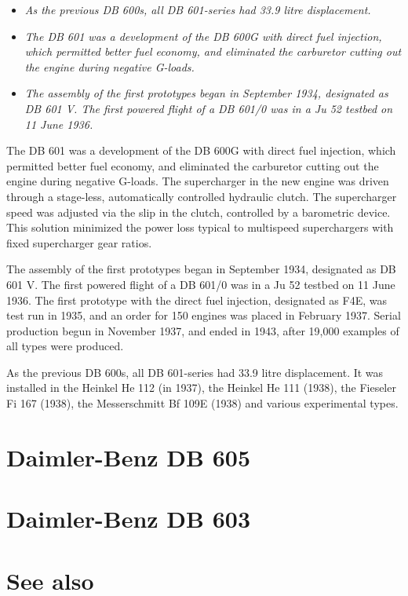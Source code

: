 \begin{itemize}
\item
  \emph{As the previous DB 600s, all DB 601-series had 33.9 litre
  displacement.}
\item
  \emph{The DB 601 was a development of the DB 600G with direct fuel
  injection, which permitted better fuel economy, and eliminated the
  carburetor cutting out the engine during negative G-loads.}
\item
  \emph{The assembly of the first prototypes began in September 1934,
  designated as DB 601 V. The first powered flight of a DB 601/0 was in
  a Ju 52 testbed on 11 June 1936.}
\end{itemize}

The DB 601 was a development of the DB 600G with direct fuel injection,
which permitted better fuel economy, and eliminated the carburetor
cutting out the engine during negative G-loads. The supercharger in the
new engine was driven through a stage-less, automatically controlled
hydraulic clutch. The supercharger speed was adjusted via the slip in
the clutch, controlled by a barometric device. This solution minimized
the power loss typical to multispeed superchargers with fixed
supercharger gear ratios.

The assembly of the first prototypes began in September 1934, designated
as DB 601 V. The first powered flight of a DB 601/0 was in a Ju 52
testbed on 11 June 1936. The first prototype with the direct fuel
injection, designated as F4E, was test run in 1935, and an order for 150
engines was placed in February 1937. Serial production begun in November
1937, and ended in 1943, after 19,000 examples of all types were
produced.

As the previous DB 600s, all DB 601-series had 33.9 litre displacement.
It was installed in the Heinkel He 112 (in 1937), the Heinkel He 111
(1938), the Fieseler Fi 167 (1938), the Messerschmitt Bf 109E (1938) and
various experimental types.

\section{Daimler-Benz DB 605}\label{daimler-benz-db-605}

\section{Daimler-Benz DB 603}\label{daimler-benz-db-603}

\section{See also}\label{see-also}

